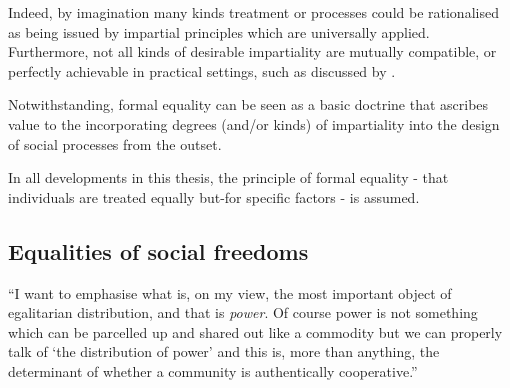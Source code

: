 Indeed, by imagination many kinds treatment or processes could be rationalised as being issued by impartial principles which are universally applied. Furthermore, not all kinds of desirable impartiality are mutually compatible, or perfectly achievable in practical settings, such as discussed by \cite{Hutchinson_2019}.

Notwithstanding, formal equality can be seen as a basic doctrine that ascribes value to the incorporating degrees (and/or kinds) of impartiality into the design of social processes from the outset.%

In all developments in this thesis, the principle of formal equality - that individuals are treated equally but-for specific factors - is assumed.

\subsection{Equalities of social freedoms}\DIFaddbegin \label{sec:philosophy_social_freedoms}
\DIFaddend 

\begin{displayquote}
``I want to emphasise what is, on my view, the most important object of egalitarian distribution, and that is \textit{power}. Of course power is not something which can be parcelled up and shared out like a commodity but we can properly talk of `the distribution of power' and this is, more than anything, the determinant of whether a community is authentically cooperative.'' \citep{TheSocialBasisofEquality:1998}
\end{displayquote}

